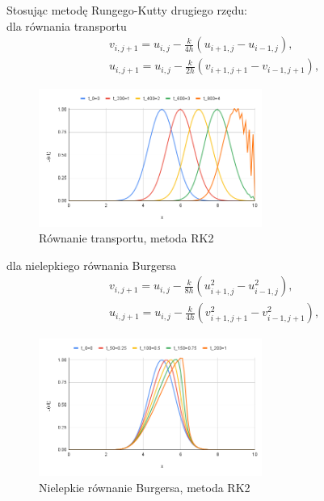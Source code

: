 \documentclass[12pt, a4paper]{article}
\begin{document}
Stosując metodę Rungego-Kutty drugiego rzędu:\\
dla równania transportu
\begin{equation}
\begin{split}
& v_{i,j+1}=u_{i,j}-\frac{k}{4h}(u_{i+1,j}-u_{i-1,j}),\\
& u_{i,j+1}=u_{i,j}-\frac{k}{2h}(v_{i+1,j+1}-v_{i-1,j+1}),
\end{split}
\end{equation}
\begin{figure}[h]
\caption{Równanie transportu, metoda RK2}
\centering
\includegraphics[width=0.65\textwidth]{4}
\end{figure}

dla nielepkiego równania Burgersa
\begin{equation}
\begin{split}
& v_{i,j+1}=u_{i,j}-\frac{k}{8h}(u_{i+1,j}^{2}-u_{i-1,j}^{2}),\\
& u_{i,j+1}=u_{i,j}-\frac{k}{4h}(v_{i+1,j+1}^{2}-v_{i-1,j+1}^{2}),
\end{split}
\end{equation}
\begin{figure}[h]
\caption{Nielepkie równanie Burgersa, metoda RK2}
\centering
\includegraphics[width=0.65\textwidth]{5}
\end{figure}
\newpage
\newpage
\end{document}
